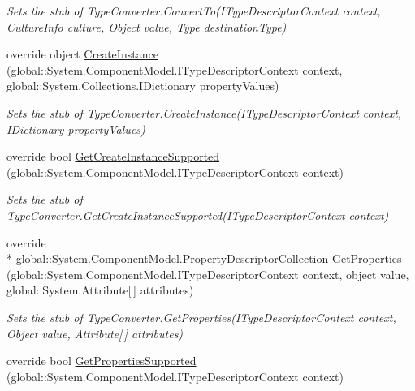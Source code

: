\begin{DoxyCompactItemize}
\begin{DoxyCompactList}\small\item\em Sets the stub of Type\-Converter.\-Convert\-To(\-I\-Type\-Descriptor\-Context context, Culture\-Info culture, Object value, Type destination\-Type)\end{DoxyCompactList}\item 
override object \hyperlink{class_system_1_1_component_model_1_1_fakes_1_1_stub_type_converter_a6f371cfb6c5a6eaaa245f169e0da16e9}{Create\-Instance} (global\-::\-System.\-Component\-Model.\-I\-Type\-Descriptor\-Context context, global\-::\-System.\-Collections.\-I\-Dictionary property\-Values)
\begin{DoxyCompactList}\small\item\em Sets the stub of Type\-Converter.\-Create\-Instance(\-I\-Type\-Descriptor\-Context context, I\-Dictionary property\-Values)\end{DoxyCompactList}\item 
override bool \hyperlink{class_system_1_1_component_model_1_1_fakes_1_1_stub_type_converter_ab625a42f98399b10278920f459910614}{Get\-Create\-Instance\-Supported} (global\-::\-System.\-Component\-Model.\-I\-Type\-Descriptor\-Context context)
\begin{DoxyCompactList}\small\item\em Sets the stub of Type\-Converter.\-Get\-Create\-Instance\-Supported(\-I\-Type\-Descriptor\-Context context)\end{DoxyCompactList}\item 
override \\*
global\-::\-System.\-Component\-Model.\-Property\-Descriptor\-Collection \hyperlink{class_system_1_1_component_model_1_1_fakes_1_1_stub_type_converter_a48d2e06f5254a355b9f12b236d0b99b9}{Get\-Properties} (global\-::\-System.\-Component\-Model.\-I\-Type\-Descriptor\-Context context, object value, global\-::\-System.\-Attribute\mbox{[}$\,$\mbox{]} attributes)
\begin{DoxyCompactList}\small\item\em Sets the stub of Type\-Converter.\-Get\-Properties(\-I\-Type\-Descriptor\-Context context, Object value, Attribute\mbox{[}$\,$\mbox{]} attributes)\end{DoxyCompactList}\item 
override bool \hyperlink{class_system_1_1_component_model_1_1_fakes_1_1_stub_type_converter_aa95c935662b1d0eb5a02a2627c33240d}{Get\-Properties\-Supported} (global\-::\-System.\-Component\-Model.\-I\-Type\-Descriptor\-Context context)

\end{DoxyCompactItemize}
